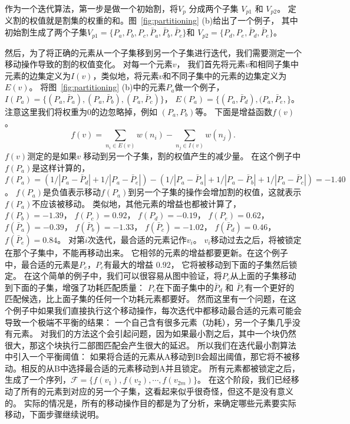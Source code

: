 作为一个迭代算法，第一步是做一个初始割，将$V_p$ 分成两个子集 $V_{p1}$ 和 $V_{p2}$。
定义割的权值就是割集的权重的和。图~\ref{fig:partitioning} (b)给出了一个例子，
其中初始割生成了两个子集$V_{p1}=\{P_a, P_b, P_c, \bar{P}_a,
  \bar{P}_b, \bar{P}_c\}$和 $V_{p2}=\{P_d, P_e, \bar{P}_d,
  \bar{P}_e\}$。
  
  然后，为了将正确的元素从一个子集移到另一个子集进行迭代，我们需要测定一个移动操作导致的割的权值变化。
  对每一个元素$v$， 我们首先将元素$v$和相同子集中元素的边集定义为$I(v)$，类似地，将元素$v$和不同子集中的元素的边集定义为$E(v)$。
  将图~\ref{fig:partitioning} (b)中的元素$P_a$做一个例子，
  $I(P_a) = \{(P_a,
    \bar{P}_a), (P_a, \bar{P}_b), (P_a, \bar{P}_c)\}$， $E(P_a) =
  \{(P_a, \bar{P}_d), (P_a, \bar{P}_e, \}$。
  注意这里我们将权重为$0$的边忽略掉，例如 $(P_a, P_b)$等。
  下面是增益函数$f(v)$。
  \begin{equation}
  f(v) = \sum_{n_i \in E(v)}{w(n_i )} - \sum_{n_j \in I(v)}{w(n_j )}.
  \end{equation}
  $f(v)$测定的是如果$v$ 移动到另一个子集，割的权值产生的减少量。
  在这个例子中$f(P_a)$是这样计算的， $f(P_a) =
  (1/|P_a-\bar{P}_d|+1/|P_a-\bar{P}_e|)-(1/|P_a-\bar{P}_a|+1/|P_a-\bar{P}_b|+1/|P_a-\bar{P}_c|)=-1.40$。
  $f(P_a)$是负值表示移动$f(P_a)$到另一个子集的操作会增加割的权值，这就表示$f(P_a)$不应该被移动。
  类似地，其他元素的增益也都被计算了， $f(P_b)=-1.39$， $f(P_c) = 0.92$， $f(P_d) = -0.19$，
  $f(P_e)=0.62$， $f(\bar{P}_a) = -0.39$， $f(\bar{P}_b)=-1.33$，
  $f(\bar{P}_c)=-1.02$， $f(\bar{P}_d) = 0.46$， $f(\bar{P}_e) = 0.84$。
  对第$i$次迭代，最合适的元素记作$v_i$。 $v_i$移动过去之后，将被锁定在那个子集中，不能再移动出来。
  它相邻的元素的增益都要更新。在这个例子中，最合适的元素是$P_c$，$P_c$有最大的增益 $0.92$，
  它将被移动到下面的子集然后锁定。
  在这个简单的例子中，我们可以很容易从图中验证，将$P_c$从上面的子集移动到下面的子集，增强了功耗匹配质量：
$P_c$在下面子集中的$\bar{P}_d$ 和 $\bar{P}_e$有一个更好的匹配候选，比上面子集的任何一个功耗元素都要好。
然而这里有一个问题，在这个例子中如果我们直接执行这个移动操作，每次迭代中都移动最合适的元素可能会导致一个极端不平衡的结果：
一个自己含有很多元素（功耗），另一个子集几乎没有元素。
对我们的方法这个会引起问题，因为如果最小割之后，其中一个块仍然很大，那这个块执行二部图匹配会产生很大的延迟。
所以我们在迭代最小割算法中引入一个平衡阈值：
如果将合适的元素从A移动到B会超出阈值，那它将不被移动。相反的从B中选择最合适的元素移动到A并且锁定。
所有元素都被锁定之后，生成了一个序列，$\mathcal{F} = \{f(v_1), f(v_2), \cdots, f(v_{2m})\}$。
在这个阶段，我们已经移动了所有的元素到对应的另一个子集，这看起来似乎很奇怪，但这不是没有意义的。
实际的情况是，所有的移动操作目的都是为了分析，来确定哪些元素要实际移动，下面步骤继续说明。

